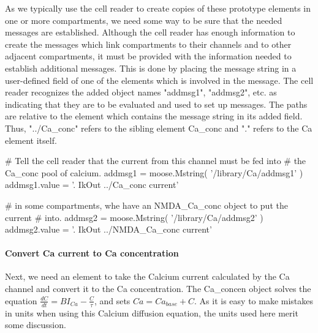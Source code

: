 \documentclass[]{article}%
\begin{document}
 As we typically use the cell reader to create copies of these prototype
 elements in one or more compartments, we need some way to be sure that the
 needed messages are established.  Although the cell reader has enough
 information to create the messages which link compartments to their channels
 and to other adjacent compartments, it must be provided with the information
 needed to establish additional messages.  This is done by placing the message
 string in a user-defined field of one of the elements which is involved in the
 message.  The cell reader recognizes the added object names "addmsg1",
 "addmsg2", etc. as indicating that they are to be evaluated and used to set up
 messages.  The paths are relative to the element which contains the message
 string in its added field.  Thus, "../Ca\_conc" refers to the sibling element
 {\Tt{}Ca{\_}conc\nwendquote} and "." refers to the Ca element itself.

\nwenddocs{}\endmoddef\nwstartdeflinemarkup{}\nwenddeflinemarkup
# Tell the cell reader that the current from this channel must be fed into
# the Ca_conc pool of calcium.
addmsg1 = moose.Mstring( '/library/Ca/addmsg1' )
addmsg1.value = '.  IkOut  ../Ca_conc  current'

# in some compartments, whe have an NMDA_Ca_conc object to put the current
# into.
addmsg2 = moose.Mstring( '/library/Ca/addmsg2' )
addmsg2.value = '.  IkOut  ../NMDA_Ca_conc  current'
\eatline
{}\nwendcode{} 
\paragraph{Convert Ca current to Ca concentration}

  Next, we need an element to take the Calcium current calculated by the Ca
  channel and convert it to the Ca concentration.  The {\Tt{}Ca{\_}concen\nwendquote} object
  solves the equation $\frac{dC}{dt} = B I_{Ca} - \frac{C}{\tau}$, and sets 
  $Ca=Ca_{base} + C$.  As it is easy to make mistakes in units when using
  this Calcium diffusion equation, the units used here merit some discussion.
\end{document}

